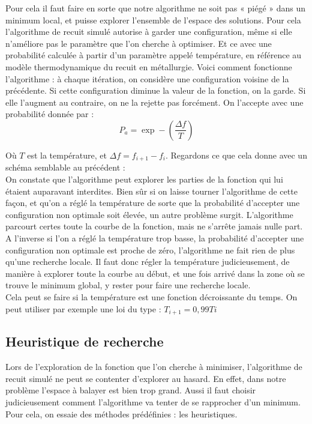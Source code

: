 Pour cela il faut faire en sorte que notre algorithme ne soit pas « piégé » dans un minimum local, et puisse explorer l'ensemble de l'espace des solutions. Pour cela l'algorithme de recuit simulé autorise à garder une configuration, même si elle n'améliore pas le paramètre que l'on cherche à optimiser. Et ce avec une probabilité calculée à partir d'un paramètre appelé température, en référence au modèle thermodynamique du recuit en métallurgie. Voici comment fonctionne l'algorithme : à chaque itération, on considère une configuration voisine de la précédente. Si cette configuration diminue la valeur de la fonction, on la garde. Si elle l'augment au contraire, on ne la rejette pas forcément. On l'accepte avec une probabilité donnée par :\\

\begin{equation}
P_a = \exp -(\frac{\Delta f}{T}) 
\end{equation}

Où $T$ est la température, et $\Delta f = f_{i+1} - f_{i}$. Regardons ce que cela donne avec un schéma semblable au précédent : \\

On constate que l'algorithme peut explorer les parties de la fonction qui lui étaient auparavant interdites. Bien sûr si on laisse tourner l'algorithme de cette façon, et qu'on a réglé la température de sorte  que la probabilité d'accepter une configuration non optimale soit élevée, un autre problème surgit. L'algorithme parcourt certes toute la courbe de la fonction, mais ne s'arrête jamais nulle part. A l'inverse si l'on a réglé la température trop basse, la probabilité d'accepter une configuration non optimale est proche de zéro, l'algorithme ne fait rien de plus qu'une recherche locale. Il faut donc régler la température judicieusement, de manière à explorer toute la courbe au début, et une fois arrivé dans la zone où se trouve le minimum global, y rester pour faire une recherche locale. \\

Cela peut se faire si la température est une fonction décroissante du temps. On peut utiliser par exemple une loi du type : $ T_{i+1} = 0,99{Ti}$\\

\subsection*{Heuristique de recherche}

Lors de l'exploration de la fonction que l'on cherche à minimiser, l'algorithme de recuit simulé ne peut se contenter d'explorer au hasard. En effet, dans notre problème l'espace à balayer est bien trop grand. Aussi il faut choisir judicieusement comment l'algorithme va tenter de se rapprocher d'un minimum. Pour cela, on essaie des méthodes prédéfinies : les heuristiques.

